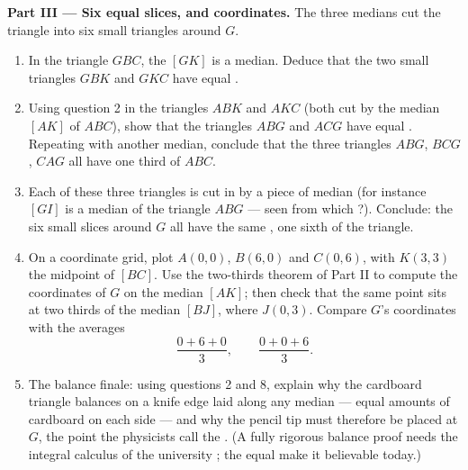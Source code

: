\begin{problem}
\medskip
\noindent\textbf{Part III --- Six equal slices, and coordinates.}
The three medians cut the triangle into six small triangles
around $G$.
\begin{enumerate}[resume]
  \item In the triangle $GBC$, the  $[GK]$ is a median.
        Deduce that the two small triangles $GBK$ and $GKC$ have
        equal .
  \item Using question 2 in the triangles $ABK$ and $AKC$ (both
        cut by the median $[AK]$ of $ABC$), show that the
        triangles $ABG$ and $ACG$ have equal . Repeating
        with another median, conclude that the three triangles
        $ABG$, $BCG$, $CAG$ all have  one third of $ABC$.
  \item Each of these three triangles is cut in  by a piece
        of median (for instance $[GI]$ is a median of the
        triangle $ABG$ --- seen from which ?). Conclude: the six
        small slices around $G$ all have the same , one sixth
        of the triangle.
  \item On a coordinate grid, plot $A(0, 0)$, $B(6, 0)$ and
        $C(0, 6)$, with $K(3, 3)$ the midpoint of $[BC]$. Use the
        two-thirds theorem of Part II to compute the coordinates
        of $G$ on the median $[AK]$; then check that the same
        point sits at two thirds of the median $[BJ]$, where
        $J(0, 3)$. Compare $G$'s coordinates with the averages
        \[
        \frac{0 + 6 + 0}{3},
        \qquad
        \frac{0 + 0 + 6}{3} .
        \]
  \item The balance finale: using questions 2 and 8, explain why
        the cardboard triangle balances on a knife edge laid
        along any median --- equal amounts of cardboard on each
        side --- and why the pencil tip must therefore be placed
        at $G$, the point the physicists call the . (A fully rigorous balance proof needs the
        integral calculus of the university ; the equal
         make it believable today.)
\end{enumerate}
\end{problem}
